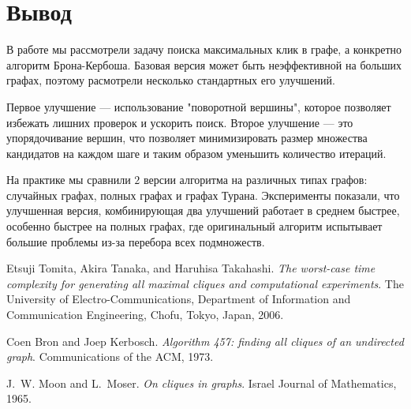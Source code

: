 \documentclass{article}
\begin{document}
\section{Вывод}
В работе мы рассмотрели задачу поиска максимальных клик в графе, а конкретно алгоритм Брона-Кербоша. Базовая версия может быть неэффективной на больших графах, поэтому расмотрели несколько стандартных его улучшений.

Первое улучшение — использование "поворотной вершины", которое позволяет избежать лишних проверок и ускорить поиск. Второе улучшение — это упорядочивание вершин, что позволяет минимизировать размер множества кандидатов на каждом шаге и таким образом уменьшить количество итераций.

На практике мы сравнили $2$ версии алгоритма на различных типах графов: случайных графах, полных графах и графах Турана. Эксперименты показали, что улучшенная версия, комбинирующая два улучшений работает в среднем быстрее, особенно быстрее на полных графах, где оригинальный алгоритм испытывает большие проблемы из-за перебора всех подмножеств.


\newpage

\begin{thebibliography}{9}

Etsuji Tomita, Akira Tanaka, and Haruhisa Takahashi.  
\textit{The worst-case time complexity for generating all maximal cliques and computational experiments}.  
The University of Electro-Communications, Department of Information and Communication Engineering, Chofu, Tokyo, Japan, 2006.

Coen Bron and Joep Kerbosch.  
\textit{Algorithm 457: finding all cliques of an undirected graph}.  
Communications of the ACM, 1973.

J.~W. Moon and L.~Moser.  
\textit{On cliques in graphs}.  
Israel Journal of Mathematics, 1965.

\end{thebibliography}
\end{document}
